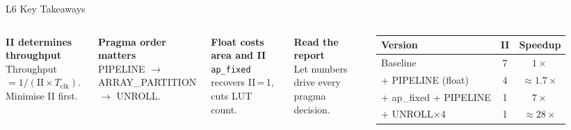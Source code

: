 \documentclass[aspectratio=169,12pt]{beamer}
\begin{document}

\begin{frame}{L6 Key Takeaways}
\vspace{0.05cm}
\begin{columns}[T,totalwidth=\textwidth]

  \colorbox{Navy!8}{\parbox{\dimexpr\linewidth-2\fboxsep\relax}{\vspace{2pt}
    \textbf{\color{Navy}II determines throughput}\\[0pt]
    {\small Throughput $= 1/(\text{II} \times T_\text{clk})$. Minimise II first.}
  \vspace{2pt}}}
  \vspace{3pt}

  \colorbox{Teal!10}{\parbox{\dimexpr\linewidth-2\fboxsep\relax}{\vspace{2pt}
    \textbf{\color{Teal}Pragma order matters}\\[0pt]
    {\small PIPELINE $\to$ ARRAY\_PARTITION $\to$ UNROLL.}
  \vspace{2pt}}}
  \vspace{3pt}

  \colorbox{Orange!10}{\parbox{\dimexpr\linewidth-2\fboxsep\relax}{\vspace{2pt}
    \textbf{\color{Orange}Float costs area and II}\\[0pt]
    {\small \texttt{ap\_fixed} recovers II\,=\,1, cuts LUT count.}
  \vspace{2pt}}}
  \vspace{3pt}

  \colorbox{Navy!8}{\parbox{\dimexpr\linewidth-2\fboxsep\relax}{\vspace{2pt}
    \textbf{\color{Navy}Read the report}\\[0pt]
    {\small Let numbers drive every pragma decision.}
  \vspace{2pt}}}

  \vspace{0.2cm}

  \begin{tabular}{lcc}
    \hline
    \rowcolor{Navy!10}\textbf{Version} & \textbf{II} & \textbf{Speedup}\\
    \hline
    Baseline                       & 7 & $1\times$\\
    \rowcolor{Navy!5}+ PIPELINE (float) & 4 & ${\approx}1.7\times$\\
    + ap\_fixed + PIPELINE         & 1 & $7\times$\\
    \rowcolor{Navy!5}+ UNROLL$\times$4  & 1 & ${\approx}28\times$\\
    \hline
  \end{tabular}


\end{columns}
\end{frame}
\end{document}
